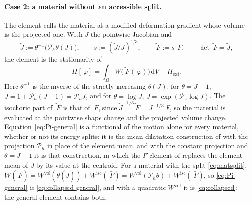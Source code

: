 \documentclass{article}
\newcommand{\F}{~F}
\newcommand{\disp}{~\varphi}
\newcommand{\diff}{\,\mathrm{d}}
\newcommand{\supvol}{^{\mathrm{vol}}}
\newcommand{\supiso}{^{\mathrm{iso}}}
\theoremstyle{definition}
\theoremstyle{plain}
\begin{document}
\paragraph{Case 2: a material without an accessible split.} The element
calls the material at a modified deformation gradient whose volume is the
projected one. With $J$ the pointwise Jacobian and
\begin{equation}
  \label{eq:Ftilde}
  \tilde J := \theta^{-1}\!\big(\mathcal{P}_h\theta(J)\big),
  \qquad
  s := (\tilde J / J)^{1/3},
  \qquad
  \tilde{\F} := s\,\F,
  \qquad \det\tilde{\F} = \tilde J ,
\end{equation}
the element is the stationarity of
\begin{equation}
  \label{eq:Pi-general}
  \Pi[\disp] = \int_\Omega W\big(\tilde{\F}(\disp)\big) \diff V - \Pi_{\mathrm{ext}} .
\end{equation}
Here $\theta^{-1}$ is the inverse of the strictly increasing
$\theta(J)$; for $\theta = J - 1$, $\tilde J = 1 + \mathcal{P}_h(J - 1) =
\mathcal{P}_h J$, and for $\theta = \log J$, $\tilde J = \exp(\mathcal{P}_h
\log J)$. The isochoric part of $\tilde{\F}$ is that of $\F$, since
$\tilde J^{-1/3}\tilde{\F} = J^{-1/3}\F$, so the material is evaluated at
the pointwise shape change and the projected volume change.
Equation~\eqref{eq:Pi-general} is a functional of the motion alone for
every material, whether or not its energy splits; it is the mean-dilatation
construction of \textcite{SimoTaylorPister:1985} with the projection
$\mathcal{P}_h$ in place of the element mean, and with the constant
projection and $\theta = J - 1$ it is that construction, in which the
$\bar F$ element of \textcite{deSouzaNeto.etal:1996} replaces the element mean
of $J$ by its value at the centroid. For a material with the split
\eqref{eq:matsplit}, $W(\tilde{\F}) = W\supvol(\theta(\tilde J)) +
W\supiso(\bar{\F}) = W\supvol(\mathcal{P}_h\theta) + W\supiso(\bar{\F})$,
so \eqref{eq:Pi-general} is \eqref{eq:collapsed-general}, and with a
quadratic $W\supvol$ it is \eqref{eq:collapsed}: the general element
contains both.
\end{document}
